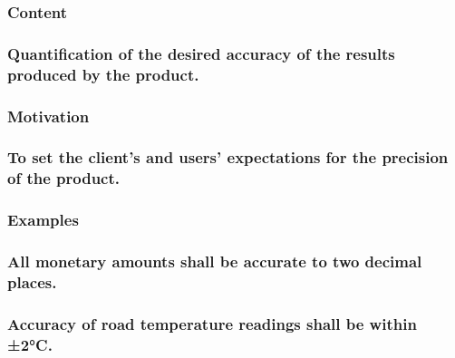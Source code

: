 \documentclass[
]{article}
\begin{document}
\hypertarget{content-39}{%
\subsubsection{Content}\label{content-39}}

\hypertarget{quantification-of-the-desired-accuracy-of-the-results-produced-by-the-product.}{%
\subsubsection{Quantification of the desired accuracy of the results
produced by the
product.}\label{quantification-of-the-desired-accuracy-of-the-results-produced-by-the-product.}}

\hypertarget{motivation-38}{%
\subsubsection{Motivation}\label{motivation-38}}

\hypertarget{to-set-the-clients-and-users-expectations-for-the-precision-of-the-product.}{%
\subsubsection{\texorpdfstring{To set the client's and users'
expectations for the precision of the product.
}{To set the client's and users' expectations for the precision of the product. }}\label{to-set-the-clients-and-users-expectations-for-the-precision-of-the-product.}}

\hypertarget{examples-23}{%
\subsubsection{Examples}\label{examples-23}}

\hypertarget{all-monetary-amounts-shall-be-accurate-to-two-decimal-places.}{%
\subsubsection{All monetary amounts shall be accurate to two decimal
places.}\label{all-monetary-amounts-shall-be-accurate-to-two-decimal-places.}}

\hypertarget{accuracy-of-road-temperature-readings-shall-be-within-2c.}{%
\subsubsection{Accuracy of road temperature readings shall be within
±2°C.}\label{accuracy-of-road-temperature-readings-shall-be-within-2c.}}
\end{document}
